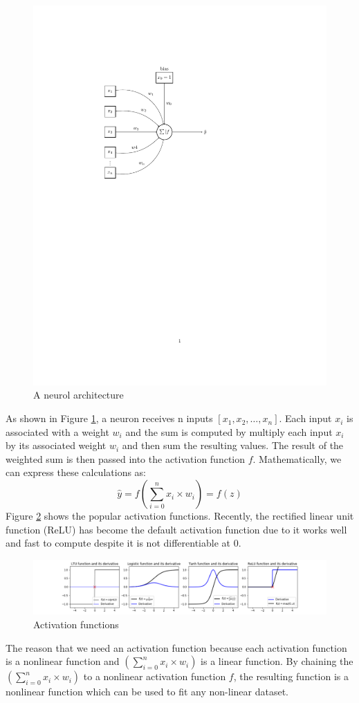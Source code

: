 \documentclass{article}
\begin{document}
\begin{figure}[h]
\centering
\includegraphics[width=.75\textwidth]{Neuron.pdf}	
\caption{A neurol architecture}
\label{fig:neuron}
\end{figure}

As shown in Figure \ref{fig:neuron}, a neuron receives n inputs $[x_1,x_2, \dots, x_n]$. Each input $x_i$ is associated with a weight $w_i$ and the sum is computed by multiply each input $x_i$ by its associated weight $w_i$ and then sum the resulting values. The result of the weighted sum is then passed into the activation function $f$. Mathematically, we can express these calculations as:
\begin{equation} \label{neuronfunc}
\hat{y} = f\left(\sum_{i=0}^{n}x_i \times w_i\right) = f(z)
\end{equation}
Figure \ref{fig:actFuncs} shows the popular activation functions. Recently, the rectified linear unit function (ReLU) has become the default activation function due to it works well and fast to compute despite it is not differentiable at 0.
\begin{figure}[h]
\centering
\includegraphics[width=1.0\textwidth]{activationFuncs.png}
\caption{Activation functions}
\label{fig:actFuncs}
\end{figure}
The reason that we need an activation function because each activation function is a nonlinear function and $\left(\sum_{i=0}^{n}x_i \times w_i\right)$ is a linear function. By chaining the $\left(\sum_{i=0}^{n}x_i \times w_i\right)$ to a nonlinear activation function $f$, the resulting function is a nonlinear function which can be used to fit any non-linear dataset.
\end{document}
